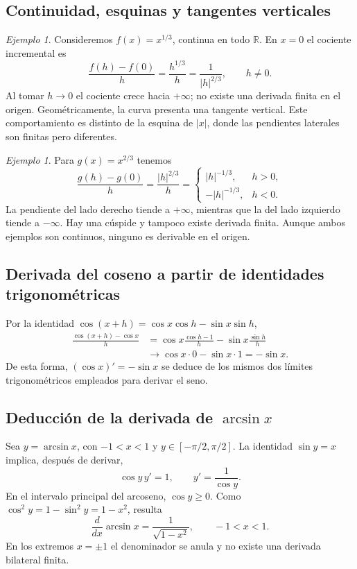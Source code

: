 \documentclass[12pt]{article}
\theoremstyle{remark}
\newtheorem{ejemplo}[definicion]{Ejemplo}
\newcommand{\R}{\mathbb{R}}
\begin{document}
\subsection*{Continuidad, esquinas y tangentes verticales}
\begin{ejemplo}
Consideremos $f(x)=x^{1/3}$, continua en todo $\R$. En $x=0$ el cociente incremental es
\[
\frac{f(h)-f(0)}h=\frac{h^{1/3}}h=\frac1{|h|^{2/3}},\qquad h\ne0.
\]
Al tomar $h\to0$ el cociente crece hacia $+\infty$; no existe una derivada finita en el origen. Geométricamente, la curva presenta una tangente vertical. Este comportamiento es distinto de la esquina de $|x|$, donde las pendientes laterales son finitas pero diferentes.
\end{ejemplo}

\begin{ejemplo}
Para $g(x)=x^{2/3}$ tenemos
\[
\frac{g(h)-g(0)}h=\frac{|h|^{2/3}}h=
\begin{cases}|h|^{-1/3},&h>0,\\-|h|^{-1/3},&h<0.\end{cases}
\]
La pendiente del lado derecho tiende a $+\infty$, mientras que la del lado izquierdo tiende a $-\infty$. Hay una cúspide y tampoco existe derivada finita. Aunque ambos ejemplos son continuos, ninguno es derivable en el origen.
\end{ejemplo}

\subsection*{Derivada del coseno a partir de identidades trigonométricas}
Por la identidad $\cos(x+h)=\cos x\cos h-\sin x\sin h$,
\begin{align*}
\frac{\cos(x+h)-\cos x}{h}
&=\cos x\frac{\cos h-1}{h}-\sin x\frac{\sin h}{h}\\
&\longrightarrow \cos x\cdot0-\sin x\cdot1=-\sin x.
\end{align*}
De esta forma, $\boxed{(\cos x)'=-\sin x}$ se deduce de los mismos dos límites trigonométricos empleados para derivar el seno.

\subsection*{Deducción de la derivada de $\arcsin x$}
Sea $y=\arcsin x$, con $-1<x<1$ y $y\in[-\pi/2,\pi/2]$. La identidad $\sin y=x$ implica, después de derivar,
\[
\cos y\,y'=1,\qquad y'=\frac1{\cos y}.
\]
En el intervalo principal del arcoseno, $\cos y\ge0$. Como $\cos^2y=1-\sin^2y=1-x^2$, resulta
\[
\boxed{\frac{d}{dx}\arcsin x=\frac1{\sqrt{1-x^2}}},\qquad -1<x<1.
\]
En los extremos $x=\pm1$ el denominador se anula y no existe una derivada bilateral finita.
\end{document}
